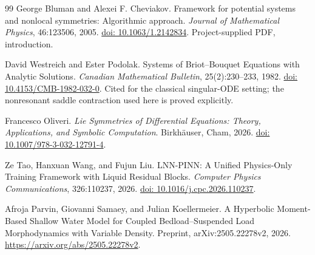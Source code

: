 \documentclass[12pt,a4paper,oneside]{report}
\numberwithin{equation}{chapter}
\theoremstyle{remark}\newtheorem{remark}[theorem]{Remark}
\newcommand{\doi}[1]{\href{https://doi.org/#1}{doi: #1}}
\begin{document}
\begin{thebibliography}{99}
George Bluman and Alexei F. Cheviakov. Framework for potential systems and
nonlocal symmetries: Algorithmic approach. \emph{Journal of Mathematical
Physics}, 46:123506, 2005. \doi{10.1063/1.2142834}.
Project-supplied PDF, introduction.

David Westreich and Ester Podolak. Systems of Briot--Bouquet Equations with
Analytic Solutions. \emph{Canadian Mathematical Bulletin}, 25(2):230--233,
1982. \doi{10.4153/CMB-1982-032-0}. Cited for the classical singular-ODE
setting; the nonresonant saddle contraction used here is proved explicitly.


Francesco Oliveri. \emph{Lie Symmetries of Differential Equations: Theory, Applications, and Symbolic Computation}. Birkh\"auser, Cham, 2026. \doi{10.1007/978-3-032-12791-4}.

Ze Tao, Hanxuan Wang, and Fujun Liu. LNN-PINN: A Unified Physics-Only Training Framework with Liquid Residual Blocks. \emph{Computer Physics Communications}, 326:110237, 2026. \doi{10.1016/j.cpc.2026.110237}.

Afroja Parvin, Giovanni Samaey, and Julian Koellermeier. A Hyperbolic Moment-Based
Shallow Water Model for Coupled Bedload--Suspended Load Morphodynamics with
Variable Density. Preprint, arXiv:2505.22278v2, 2026. \url{https://arxiv.org/abs/2505.22278v2}.

\end{thebibliography}
\endgroup
\end{document}
